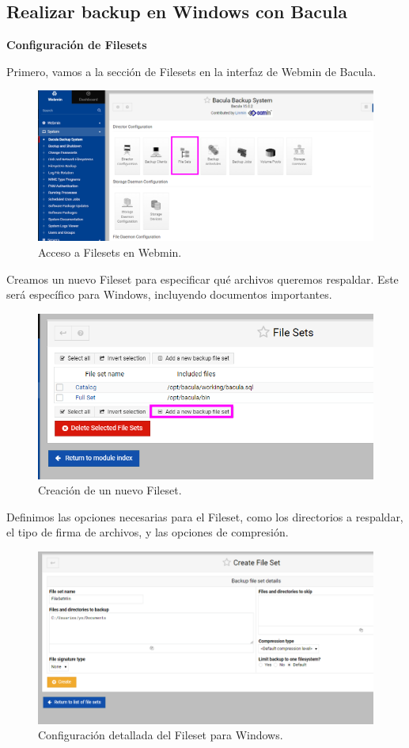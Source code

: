 \subsection{Realizar backup en Windows con Bacula}

\textbf{Configuración de Filesets}

Primero, vamos a la sección de Filesets en la interfaz de Webmin de Bacula.

\begin{figure}[H]
    \centering
    \includegraphics[width=0.5\linewidth]{instalacionBacula/filesetwebmin.png}
    \caption{Acceso a Filesets en Webmin.}
\end{figure}

Creamos un nuevo Fileset para especificar qué archivos queremos respaldar. Este será específico para Windows, incluyendo documentos importantes.

\begin{figure}[H]
    \centering
    \includegraphics[width=0.5\linewidth]{instalacionBacula/cpropiofileset.png}
    \caption{Creación de un nuevo Fileset.}
\end{figure}

Definimos las opciones necesarias para el Fileset, como los directorios a respaldar, el tipo de firma de archivos, y las opciones de compresión.

\begin{figure}[H]
    \centering
    \includegraphics[width=0.5\linewidth]{instalacionBacula/filesetWindows.png}
    \caption{Configuración detallada del Fileset para Windows.}
\end{figure}


